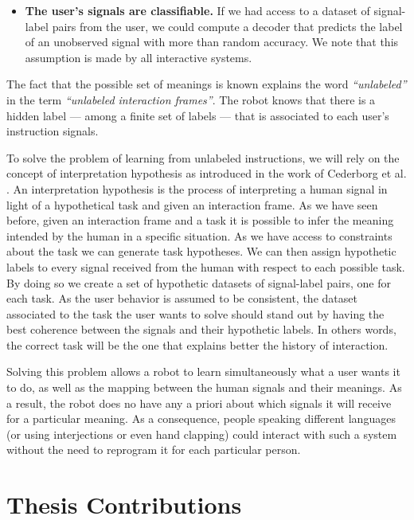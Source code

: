 \begin{itemize}
\item \textbf{The user's signals are classifiable.} If we had access to a dataset of signal-label pairs from the user, we could compute a decoder that predicts the label of an unobserved signal with more than random accuracy. We note that this assumption is made by all interactive systems.

\end{itemize}

The fact that the possible set of meanings is known explains the word \emph{``unlabeled''} in the term \emph{``unlabeled interaction frames''}. The robot knows that there is a hidden label --- among a finite set of labels --- that is associated to each user's instruction signals.

To solve the problem of learning from unlabeled instructions, we will rely on the concept of interpretation hypothesis as introduced in the work of Cederborg et al. \cite{cederborg2014social,cederborg2014thesis}. An interpretation hypothesis is the process of interpreting a human signal in light of a hypothetical task and given an interaction frame. As we have seen before, given an interaction frame and a task it is possible to infer the meaning intended by the human in a specific situation. As we have access to constraints about the task we can generate task hypotheses. We can then assign hypothetic labels to every signal received from the human with respect to each possible task. By doing so we create a set of hypothetic datasets of signal-label pairs, one for each task. As the user behavior is assumed to be consistent, the dataset associated to the task the user wants to solve should stand out by having the best coherence between the signals and their hypothetic labels. In others words, the correct task will be the one that explains better the history of interaction.

Solving this problem allows a robot to learn simultaneously what a user wants it to do, as well as the mapping between the human signals and their meanings. As a result, the robot does no have any a priori about which signals it will receive for a particular meaning. As a consequence, people speaking different languages (or using interjections or even hand clapping) could interact with such a system without the need to reprogram it for each particular person.

\section{Thesis Contributions}


